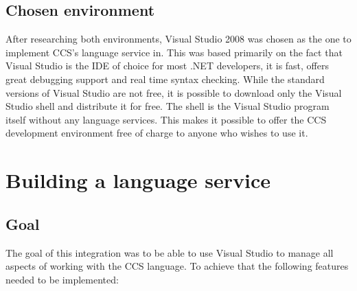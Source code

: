 	\subsection{Chosen environment}
	After researching both environments, Visual Studio 2008 was chosen as the one
	to implement CCS's language service in. This was based primarily on the fact
	that Visual Studio is the IDE of choice for most .NET developers, it is 
	fast, offers great debugging support and real time syntax checking. While 
	the standard versions of Visual Studio are not free, it is possible to 
	download only the Visual Studio shell and distribute it for free. The shell 
	is the Visual Studio program itself without any language services. This 
	makes it possible to offer the CCS development environment free of charge to 
	anyone who wishes to use it. 
	
\section{Building a language service}
	
	\subsection{Goal}
	The goal of this integration was to be able to use Visual Studio to manage 
	all aspects of working with the CCS language. To achieve that the following 
	features needed to be implemented:
	
